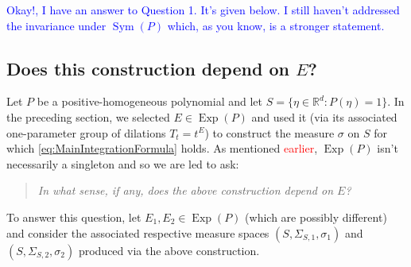 \documentclass[11pt]{article}
\theoremstyle{theorem}
\newcommand\Sym{\operatorname{Sym}}
\newcommand\Exp{\operatorname{Exp}}
\begin{document}
\textcolor{blue}{{\Large Okay!}, I have an answer to Question 1. It's given below. I still haven't addressed the invariance under $\Sym(P)$ which, as you know, is a stronger statement. }
\subsection{Does this construction depend on $E$?}\label{subsec:IndependentofE}

Let $P$ be a positive-homogeneous polynomial and let $S=\{\eta\in\mathbb{R}^d:P(\eta)=1\}$. In the preceding section, we selected $E\in\Exp(P)$ and used it (via its associated one-parameter group of dilations $T_t=t^E$) to construct the measure $\sigma$ on $S$ for which \eqref{eq:MainIntegrationFormula} holds. As mentioned \textcolor{red}{earlier}, $\Exp(P)$ isn't necessarily a singleton and so we are led to ask: 
\begin{quote}\textit{In what sense, if any, does the above construction depend on $E$?} 
\end{quote}
To answer this question, let $E_1,E_2\in\Exp(P)$  (which are possibly different) and consider the associated respective measure spaces $(S,\Sigma_{S,1},\sigma_1)$ and $(S,\Sigma_{S,2},\sigma_2)$ produced via the above construction. 
\end{document}
